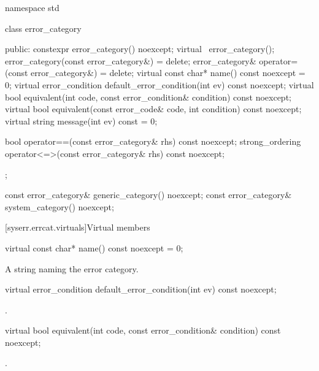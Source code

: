 %
%
%
%
%
\begin{codeblock}
namespace std {
  class error_category {
  public:
    constexpr error_category() noexcept;
    virtual ~error_category();
    error_category(const error_category&) = delete;
    error_category& operator=(const error_category&) = delete;
    virtual const char* name() const noexcept = 0;
    virtual error_condition default_error_condition(int ev) const noexcept;
    virtual bool equivalent(int code, const error_condition& condition) const noexcept;
    virtual bool equivalent(const error_code& code, int condition) const noexcept;
    virtual string message(int ev) const = 0;

    bool operator==(const error_category& rhs) const noexcept;
    strong_ordering operator<=>(const error_category& rhs) const noexcept;
  };

  const error_category& generic_category() noexcept;
  const error_category& system_category() noexcept;
}
\end{codeblock}

[syserr.errcat.virtuals]{Virtual members}

%
\begin{itemdecl}
virtual const char* name() const noexcept = 0;
\end{itemdecl}

\begin{itemdescr}
\pnum
\returns
A string naming the error category.
\end{itemdescr}

%
\begin{itemdecl}
virtual error_condition default_error_condition(int ev) const noexcept;
\end{itemdecl}

\begin{itemdescr}
\pnum
\returns
{}.
\end{itemdescr}

%
\begin{itemdecl}
virtual bool equivalent(int code, const error_condition& condition) const noexcept;
\end{itemdecl}

\begin{itemdescr}
\pnum
\returns
{}.
\end{itemdescr}

